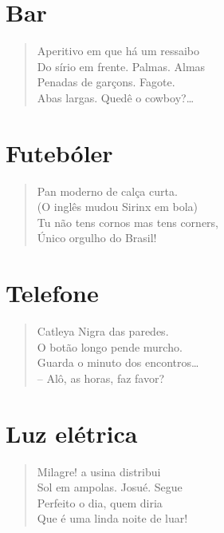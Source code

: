 
\section*{Bar}

\begin{verse}
Aperitivo em que há um ressaibo\\
Do sírio em frente. Palmas. Almas\\
Penadas de garçons. Fagote.\\
Abas largas. Quedê o cowboy?\ldots{}
\end{verse}

\medskip
\section*{Futebóler}

\begin{verse}
Pan moderno de calça curta.\\
(O inglês mudou Sirinx em bola)\\
Tu não tens cornos mas tens corners,\\
Único orgulho do Brasil!
\end{verse}

\medskip
\section*{Telefone}

\begin{verse}
Catleya Nigra das paredes.\\
O botão longo pende murcho.\\
Guarda o minuto dos encontros\ldots{}\\
-- Alô, as horas, faz favor?
\end{verse}


\medskip
\section*{Luz elétrica}

\begin{verse}
Milagre! a usina distribui\\
Sol em ampolas. Josué. Segue\\
Perfeito o dia, quem diria\\
Que é uma linda noite de luar!
\end{verse}


